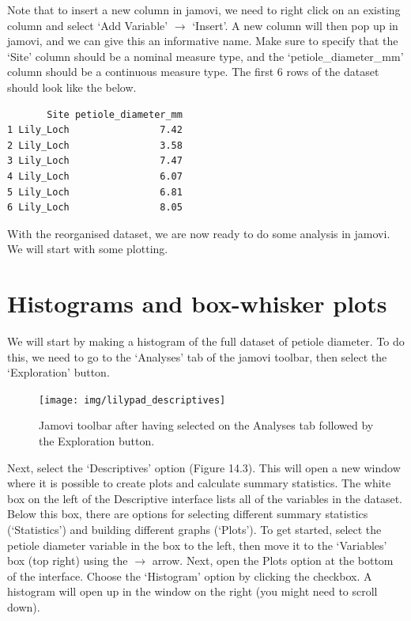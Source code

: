 \documentclass[
]{scrbook}
\begin{document}
Note that to insert a new column in jamovi, we need to right click on an existing column and select `Add Variable' \(\to\) `Insert'.
A new column will then pop up in jamovi, and we can give this an informative name.
Make sure to specify that the `Site' column should be a nominal measure type, and the `petiole\_diameter\_mm' column should be a continuous measure type.
The first 6 rows of the dataset should look like the below.

\begin{verbatim}
       Site petiole_diameter_mm
1 Lily_Loch                7.42
2 Lily_Loch                3.58
3 Lily_Loch                7.47
4 Lily_Loch                6.07
5 Lily_Loch                6.81
6 Lily_Loch                8.05
\end{verbatim}

With the reorganised dataset, we are now ready to do some analysis in jamovi.
We will start with some plotting.

\hypertarget{histograms-and-box-whisker-plots}{%
\section{Histograms and box-whisker plots}\label{histograms-and-box-whisker-plots}}

We will start by making a histogram of the full dataset of petiole diameter.
To do this, we need to go to the `Analyses' tab of the jamovi toolbar, then select the `Exploration' button.

\begin{figure}
\texttt{[image: img/lilypad\_descriptives]} \caption{Jamovi toolbar after having selected on the Analyses tab followed by the Exploration button.}\label{fig:unnamed-chunk-52}
\end{figure}

Next, select the `Descriptives' option (Figure 14.3).
This will open a new window where it is possible to create plots and calculate summary statistics.
The white box on the left of the Descriptive interface lists all of the variables in the dataset.
Below this box, there are options for selecting different summary statistics (`Statistics') and building different graphs (`Plots').
To get started, select the petiole diameter variable in the box to the left, then move it to the `Variables' box (top right) using the \(\to\) arrow.
Next, open the Plots option at the bottom of the interface.
Choose the `Histogram' option by clicking the checkbox.
A histogram will open up in the window on the right (you might need to scroll down).
\end{document}
